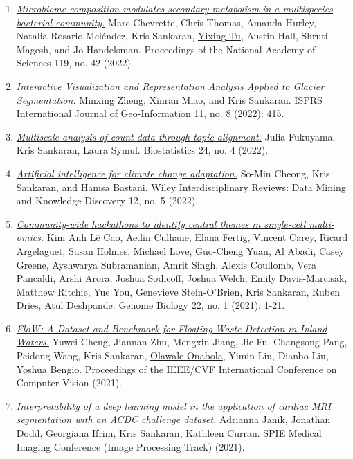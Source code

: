 \documentclass[letterpaper]{article}
\begin{document}
\begin{enumerate}
  \item \href{https://doi.org/10.1073/pnas.2212930119}{\textit{Microbiome composition modulates secondary metabolism in a multispecies bacterial community.}} Marc Chevrette, Chris Thomas, Amanda Hurley, Natalia Rosario-Meléndez, Kris Sankaran, \underline{Yixing Tu}, Austin Hall, Shruti Magesh, and Jo Handelsman. Proceedings of the National Academy of Sciences 119, no. 42 (2022).
  \item \href{https://doi.org/10.3390/ijgi11080415}{\textit{Interactive Visualization and Representation Analysis Applied to Glacier Segmentation.}} \underline{Minxing Zheng}, \underline{Xinran Miao}, and Kris Sankaran. ISPRS International Journal of Geo-Information 11, no. 8 (2022): 415.
  \item \href{https://doi.org/10.1093/biostatistics/kxac018}{\textit{Multiscale analysis of count data through topic alignment.}} Julia Fukuyama, Kris Sankaran, Laura Symul. Biostatistics 24, no. 4 (2022).
  \item \href{https://doi.org/10.1002/widm.1459}{\textit{Artificial intelligence for climate change adaptation.}} So-Min Cheong, Kris Sankaran, and Hamsa Bastani. Wiley Interdisciplinary Reviews: Data Mining and Knowledge Discovery 12, no. 5 (2022).
  \item \href{https://genomebiology.biomedcentral.com/articles/10.1186/s13059-021-02433-9}{\textit{Community-wide hackathons to identify central themes in single-cell multi-omics.}} Kim Anh Lê Cao, Aedin Culhane, Elana Fertig, Vincent Carey, Ricard Argelaguet, Susan Holmes, Michael Love, Guo-Cheng Yuan, Al Abadi, Casey Greene, Ayshwarya Subramanian, Amrit Singh, Alexis Coullomb, Vera Pancaldi, Arshi Arora, Joshua Sodicoff, Joshua Welch, Emily Davis-Marcisak, Matthew Ritchie, Yue You, Genevieve Stein-O'Brien, Kris Sankaran, Ruben Dries, Atul Deshpande. Genome Biology 22, no. 1 (2021): 1-21.
  \item \href{https://openaccess.thecvf.com/content/ICCV2021/papers/Cheng_FloW_A_Dataset_and_Benchmark_for_Floating_Waste_Detection_in_ICCV_2021_paper.pdf}{\textit{FloW: A Dataset and Benchmark for Floating Waste Detection in Inland Waters.}} Yuwei Cheng, Jiannan Zhu, Mengxin Jiang, Jie Fu, Changsong Pang, Peidong Wang, Kris Sankaran, \underline{Olawale Onabola}, Yimin Liu, Dianbo Liu, Yoshua Bengio. Proceedings of the IEEE/CVF International Conference on Computer Vision (2021).
  \item \href{https://doi.org/10.1117/12.2582227}{\textit{Interpretability of a deep learning model in the application of cardiac MRI segmentation with an ACDC challenge dataset.}} \underline{Adrianna Janik}, Jonathan Dodd, Georgiana Ifrim, Kris Sankaran, Kathleen Curran. SPIE Medical Imaging Conference (Image Processing Track) (2021).

\end{enumerate}
\end{document}

